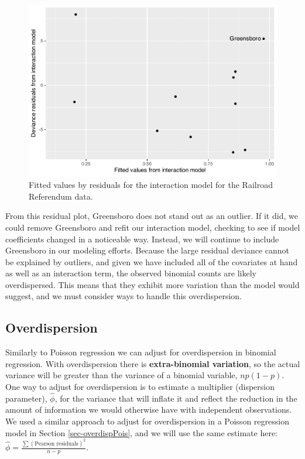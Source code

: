 \documentclass[
]{krantz}
\begin{document}
\begin{figure}

{\centering \includegraphics[width=0.6\linewidth]{bookdown-BeyondMLR_files/figure-latex/resid-1} 

}

\caption{Fitted values by residuals for the interaction model for the Railroad Referendum data.}\label{fig:resid}
\end{figure}

From this residual plot, Greensboro does not stand out as an outlier. If it did, we could remove Greensboro and refit our interaction model, checking to see if model coefficients changed in a noticeable way. Instead, we will continue to include Greensboro in our modeling efforts. Because the large residual deviance cannot be explained by outliers, and given we have included all of the covariates at hand as well as an interaction term, the observed binomial counts are likely overdispersed. This means that they exhibit more variation than the model would suggest, and we must consider ways to handle this overdispersion.

\hypertarget{sec-logOverdispersion}{%
\subsection{Overdispersion}\label{sec-logOverdispersion}}

Similarly to Poisson regression we can adjust for overdispersion  in binomial regression. With overdispersion there is \textbf{extra-binomial variation},  so the actual variance will be greater than the variance of a binomial variable, \(np(1-p)\). One way to adjust for overdispersion is to estimate a multiplier (dispersion parameter), \(\hat{\phi}\), for the variance that will inflate it and reflect the reduction in the amount of information we would otherwise have with independent observations. We used a similar approach to adjust for overdispersion in a Poisson regression model in Section \ref{sec-overdispPois}, and we will use the same estimate here: \(\hat\phi=\frac{\sum(\textrm{Pearson residuals})^2}{n-p}\).
\end{document}
